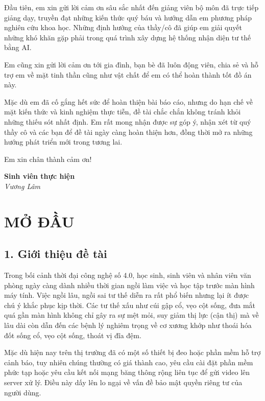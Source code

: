 \documentclass[12pt,a4paper]{report}
\begin{document}
Đầu tiên, em xin gửi lời cảm ơn sâu sắc nhất đến giảng viên bộ môn đã trực tiếp giảng dạy, truyền đạt những kiến thức quý báu và hướng dẫn em phương pháp nghiên cứu khoa học. Những định hướng của thầy/cô đã giúp em giải quyết những khó khăn gặp phải trong quá trình xây dựng hệ thống nhận diện tư thế bằng AI.

Em cũng xin gửi lời cảm ơn tới gia đình, bạn bè đã luôn động viên, chia sẻ và hỗ trợ em về mặt tinh thần cũng như vật chất để em có thể hoàn thành tốt đồ án này.

Mặc dù em đã cố gắng hết sức để hoàn thiện bài báo cáo, nhưng do hạn chế về mặt kiến thức và kinh nghiệm thực tiễn, đề tài chắc chắn không tránh khỏi những thiếu sót nhất định. Em rất mong nhận được sự góp ý, nhận xét từ quý thầy cô và các bạn để đề tài ngày càng hoàn thiện hơn, đồng thời mở ra những hướng phát triển mới trong tương lai.

Em xin chân thành cảm ơn!

\vspace{2cm}
\begin{flushright}
    \textbf{Sinh viên thực hiện} \\
    \vspace{1.5cm}
    \textit{Vương Lâm}
\end{flushright}

\newpage
\tableofcontents

\chapter*{MỞ ĐẦU}

\section*{1. Giới thiệu đề tài}
Trong bối cảnh thời đại công nghệ số 4.0, học sinh, sinh viên và nhân viên văn phòng ngày càng dành nhiều thời gian ngồi làm việc và học tập trước màn hình máy tính. Việc ngồi lâu, ngồi sai tư thế diễn ra rất phổ biến nhưng lại ít được chú ý khắc phục kịp thời. Các tư thế xấu như cúi gập cổ, vẹo cột sống, đưa mắt quá gần màn hình không chỉ gây ra sự mệt mỏi, suy giảm thị lực (cận thị) mà về lâu dài còn dẫn đến các bệnh lý nghiêm trọng về cơ xương khớp như thoái hóa đốt sống cổ, vẹo cột sống, thoát vị đĩa đệm. 

Mặc dù hiện nay trên thị trường đã có một số thiết bị đeo hoặc phần mềm hỗ trợ cảnh báo, tuy nhiên chúng thường có giá thành cao, yêu cầu cài đặt phần mềm phức tạp hoặc yêu cầu kết nối mạng băng thông rộng liên tục để gửi video lên server xử lý. Điều này dấy lên lo ngại về vấn đề bảo mật quyền riêng tư của người dùng.
\end{document}

